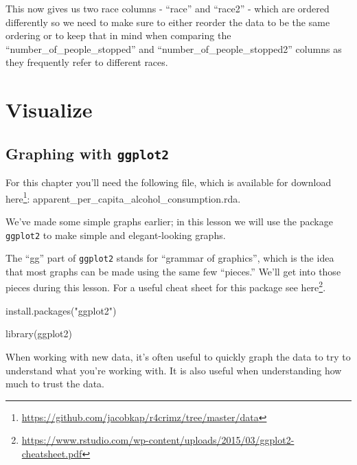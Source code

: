\documentclass[
  a4paper,
]{krantz}
\makeatletter
\newenvironment{Shaded}{\begin{snugshade}}{\end{snugshade}}
\newcommand{\FunctionTok}[1]{\textcolor[rgb]{0,0,0}{#1}}
\newcommand{\NormalTok}[1]{#1}
\newcommand{\StringTok}[1]{\textcolor[rgb]{0.5,0.5,0.5}{#1}}
\renewcommand{\href}[2]{#2\footnote{\url{#1}}}
\newenvironment{kframe}{%
\medskip{}
\setlength{\fboxsep}{.8em}
 \def\at@end@of@kframe{}%
 \ifinner\ifhmode%
  \def\at@end@of@kframe{\end{minipage}}%
  \begin{minipage}{\columnwidth}%
 \fi\fi%
 \def\FrameCommand##1{\hskip\@totalleftmargin \hskip-\fboxsep
 \colorbox{shadecolor}{##1}\hskip-\fboxsep
     \hskip-\linewidth \hskip-\@totalleftmargin \hskip\columnwidth}%
 \MakeFramed {\advance\hsize-\width
   \@totalleftmargin\z@ \linewidth\hsize
   \@setminipage}}%
 {\par\unskip\endMakeFramed%
 \at@end@of@kframe}
\renewenvironment{Shaded}{\begin{kframe}}{\end{kframe}}
\makeatother
\begin{document}
This now gives us two race columns - ``race'' and ``race2''
- which are ordered differently so we need to make sure to
either reorder the data to be the same ordering or to keep
that in mind when comparing the
``number\_of\_people\_stopped'' and
``number\_of\_people\_stopped2'' columns as they frequently
refer to different races.

\hypertarget{part-visualize}{%
\part{Visualize}\label{part-visualize}}

\hypertarget{graphing-intro}{%
\chapter{\texorpdfstring{Graphing with
\texttt{ggplot2}}{Graphing with ggplot2}}\label{graphing-intro}}

For this chapter you'll need the following file, which is
available for download
\href{https://github.com/jacobkap/r4crimz/tree/master/data}{here}:
apparent\_per\_capita\_alcohol\_consumption.rda.

We've made some simple graphs earlier; in this lesson we
will use the package \texttt{ggplot2} to make simple and
elegant-looking graphs.

The ``gg'' part of \texttt{ggplot2} stands for ``grammar of
graphics'', which is the idea that most graphs can be made
using the same few ``pieces.'' We'll get into those pieces
during this lesson. For a useful cheat sheet for this
package see
\href{https://www.rstudio.com/wp-content/uploads/2015/03/ggplot2-cheatsheet.pdf}{here}.

\begin{Shaded}
\begin{Highlighting}[]
\FunctionTok{install.packages}\NormalTok{(}\StringTok{"ggplot2"}\NormalTok{)}
\end{Highlighting}
\end{Shaded}

\begin{Shaded}
\begin{Highlighting}[]
\FunctionTok{library}\NormalTok{(ggplot2)}
\end{Highlighting}
\end{Shaded}

When working with new data, it's often useful to quickly
graph the data to try to understand what you're working
with. It is also useful when understanding how much to trust
the data.
\end{document}
